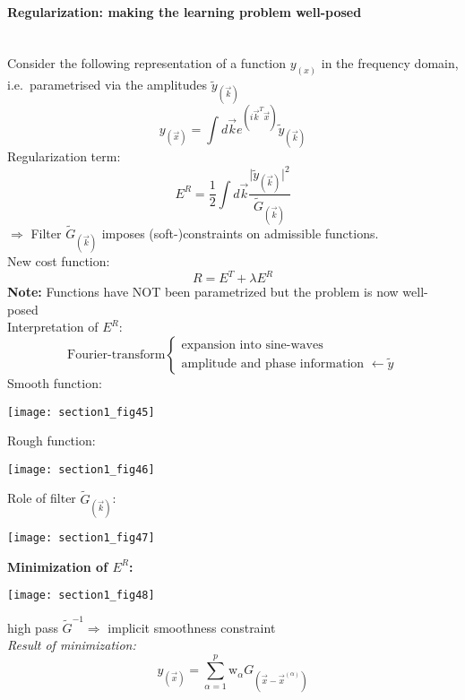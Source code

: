 \paragraph{Regularization: making the learning problem well-posed}\mbox{}\\
Consider the following representation of a function $y_{(x)}$ in the frequency domain, i.e.\ parametrised via the amplitudes $\tilde{y}_{(\vec{k})}$
\begin{equation} \tag{Fourier transform}
	y_{(\vec{x})} = \int d \vec{k} e^{(i \vec{k}^T \vec{x})}
		\tilde{y}_{(\vec{k})}
\end{equation}
Regularization term:
\begin{equation}
	E^R = \frac{1}{2} \int d \vec{k} \frac{ \big| \tilde{y}_{(\vec{k})}
		\big|^2}{\widetilde{G}_{(\vec{k})}}
\end{equation}
$\Rightarrow$ Filter $\widetilde{G}_{(\vec{k})}$ imposes (soft-)constraints on admissible functions.
\\
New cost function:
\begin{equation}
	R = E^T + \lambda E^R
\end{equation}
\textbf{Note:} Functions have NOT been parametrized but the problem is now well-posed 
\\
Interpretation of $E^R$:\\
\[ \text{Fourier-transform} \left \{ \begin{array}{l}
	\text{expansion into sine-waves} \\
	\text{amplitude and phase information } \leftarrow \tilde{y}
\end{array} \right. \]
\newpage					%
\noindent Smooth function:
\begin{center}\texttt{[image: section1\_fig45]}
\end{center}
Rough function:
\begin{center}\texttt{[image: section1\_fig46]}
\end{center}
Role of filter $\widetilde{G}_{(\vec{k})}$:
\begin{center}\texttt{[image: section1\_fig47]}
\end{center}
{\bf Minimization of $E^R$:}
\begin{center}\texttt{[image: section1\_fig48]}
\end{center}
high pass $\widetilde{G}^{-1} \Rightarrow$ implicit smoothness constraint
\\
\emph{Result of minimization:}
\begin{equation} \tag{RBF-network depending on filter}
	y_{(\vec{x})} = \sum_{\alpha = 1}^p \mathrm{w}_\alpha 
		G_{(\vec{x} - \vec{x}^{(\alpha)})}
\end{equation}
